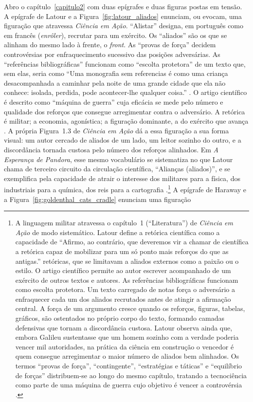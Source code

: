 Abro o capítulo~\ref{capitulo2} com duas epígrafes e duas figuras postas em tensão. A epígrafe de Latour e a Figura~\ref{fig:latour_aliados} enunciam, ou evocam, uma figuração que atravessa \textit{Ciência em Ação}. \enquote{Alistar} designa, em português como em francês (\textit{enrôler}), recrutar para um exército. Os \enquote{aliados} são os que se alinham do mesmo lado à frente, o \textit{front}. As \enquote{provas de força} decidem controvérsias por enfraquecimento sucessivo das posições adversárias. As \enquote{referências bibliográficas} funcionam como \enquote{escolta protetora} de um texto que, sem elas, seria como \enquote{Uma monografia sem referencias é como uma criança desacompanhada a caminhar pela noite de uma grande cidade que ela não conhece: isolada, perdida, pode acontecer-lhe qualquer coisa.} \parencite[p. 48]{Latour2011CienciaEmAcao}. O artigo científico é descrito como \enquote{máquina de guerra} cuja eficácia se mede pelo número e qualidade dos reforços que consegue arregimentar contra o adversário. A retórica é militar; a economia, agonística; a figuração dominante, a do exército que avança \parencite[p.~53, e cap.~1 em geral]{Latour2011CienciaEmAcao}. A própria Figura~1.3 de \textit{Ciência em Ação} dá a essa figuração a sua forma visual: um autor cercado de aliados de um lado, um leitor sozinho do outro, e a discordância tornada custosa pelo número dos reforços alinhados. Em \textit{A Esperança de Pandora}, esse mesmo vocabulário se sistematiza no que Latour chama de terceiro circuito da circulação científica, \enquote{Alianças (aliados)}, e se exemplifica pela capacidade de atrair o interesse dos militares para a física, dos industriais para a química, dos reis para a cartografia \parencite{Latour2017Esperanca}.\footnote{A linguagem militar atravessa o capítulo~1 (\enquote{Literatura}) de \textit{Ciência em Ação} de modo sistemático. Latour define a retórica científica como a capacidade de \enquote{Afirmo, ao contrário, que deveremos vir a chamar de científica a retórica capaz de mobilizar para um só ponto mais reforços do que as antigas.}\parencite[p. 92]{Latour2011CienciaEmAcao} retóricas, que se limitavam a aliados externos como a paixão ou o estilo. O artigo científico permite ao autor escrever acompanhado de um exército de outros textos e autores. As referências bibliográficas funcionam como escolta protetora. Um texto carregado de notas força o adversário a enfraquecer cada um dos aliados recrutados antes de atingir a afirmação central. A força de um argumento cresce quando os reforços, figuras, tabelas, gráficos, são ostentados no próprio corpo do texto, formando camadas defensivas que tornam a discordância custosa. Latour observa ainda que, embora Galileu sustentasse que um homem sozinho com a verdade poderia vencer mil autoridades, na prática da ciência em construção o vencedor é quem consegue arregimentar o maior número de aliados bem alinhados. Os termos \enquote{provas de força}, \enquote{contingente}, \enquote{estratégias e táticas} e \enquote{equilíbrio de forças} distribuem-se ao longo do mesmo capítulo, tratando a tecnociência como parte de uma máquina de guerra cujo objetivo é vencer a controvérsia \parencite[p.~53]{Latour2011CienciaEmAcao}.} A epígrafe de Haraway e a Figura~\ref{fig:goldenthal_cats_cradle} enunciam uma figuração 